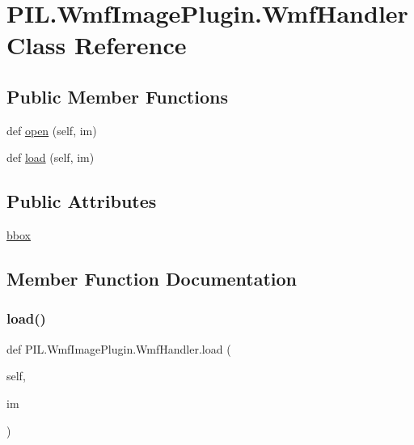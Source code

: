 \hypertarget{classPIL_1_1WmfImagePlugin_1_1WmfHandler}{}\section{P\+I\+L.\+Wmf\+Image\+Plugin.\+Wmf\+Handler Class Reference}
\label{classPIL_1_1WmfImagePlugin_1_1WmfHandler}
\subsection*{Public Member Functions}
\begin{DoxyCompactItemize}
\item 
def \hyperlink{classPIL_1_1WmfImagePlugin_1_1WmfHandler_af830063feb40d7d21499036d81056a37}{open} (self, im)
\item 
def \hyperlink{classPIL_1_1WmfImagePlugin_1_1WmfHandler_a6b4bf6fd727e197cf630e00a45372995}{load} (self, im)
\end{DoxyCompactItemize}
\subsection*{Public Attributes}
\begin{DoxyCompactItemize}
\item 
\hyperlink{classPIL_1_1WmfImagePlugin_1_1WmfHandler_a1f1ec73c02324bbad8b642b5ada4ef3f}{bbox}
\end{DoxyCompactItemize}


\subsection{Member Function Documentation}
\mbox{\label{classPIL_1_1WmfImagePlugin_1_1WmfHandler_a6b4bf6fd727e197cf630e00a45372995}} 
\subsubsection{\texorpdfstring{load()}{load()}}
{\footnotesize\ttfamily def P\+I\+L.\+Wmf\+Image\+Plugin.\+Wmf\+Handler.\+load (\begin{DoxyParamCaption}\item[{}]{self,  }\item[{}]{im }\end{DoxyParamCaption})}

